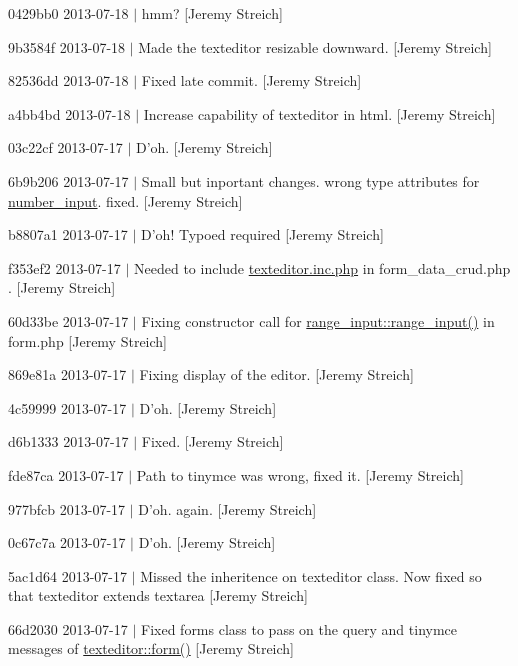 \begin{DoxyItemize}
\item 0429bb0 2013-\/07-\/18 $|$ hmm? \mbox{[}Jeremy Streich\mbox{]}
\item 9b3584f 2013-\/07-\/18 $|$ Made the texteditor resizable downward. \mbox{[}Jeremy Streich\mbox{]}
\item 82536dd 2013-\/07-\/18 $|$ Fixed late commit. \mbox{[}Jeremy Streich\mbox{]}
\item a4bb4bd 2013-\/07-\/18 $|$ Increase capability of texteditor in html. \mbox{[}Jeremy Streich\mbox{]}
\item 03c22cf 2013-\/07-\/17 $|$ D'oh. \mbox{[}Jeremy Streich\mbox{]}
\item 6b9b206 2013-\/07-\/17 $|$ Small but inportant changes. wrong type attributes for \hyperlink{classnumber__input}{number\-\_\-input}. fixed. \mbox{[}Jeremy Streich\mbox{]}
\item b8807a1 2013-\/07-\/17 $|$ D'oh! Typoed required \mbox{[}Jeremy Streich\mbox{]}
\item f353ef2 2013-\/07-\/17 $|$ Needed to include \hyperlink{texteditor_8inc_8php}{texteditor.\-inc.\-php} in form\-\_\-data\-\_\-crud.\-php . \mbox{[}Jeremy Streich\mbox{]}
\item 60d33be 2013-\/07-\/17 $|$ Fixing constructor call for \hyperlink{classrange__input_a6038a3b2b1499abb08ff6a10ac7a8e81}{range\-\_\-input\-::range\-\_\-input()} in form.\-php \mbox{[}Jeremy Streich\mbox{]}
\item 869e81a 2013-\/07-\/17 $|$ Fixing display of the editor. \mbox{[}Jeremy Streich\mbox{]}
\item 4c59999 2013-\/07-\/17 $|$ D'oh. \mbox{[}Jeremy Streich\mbox{]}
\item d6b1333 2013-\/07-\/17 $|$ Fixed. \mbox{[}Jeremy Streich\mbox{]}
\item fde87ca 2013-\/07-\/17 $|$ Path to tinymce was wrong, fixed it. \mbox{[}Jeremy Streich\mbox{]}
\item 977bfcb 2013-\/07-\/17 $|$ D'oh. again. \mbox{[}Jeremy Streich\mbox{]}
\item 0c67c7a 2013-\/07-\/17 $|$ D'oh. \mbox{[}Jeremy Streich\mbox{]}
\item 5ac1d64 2013-\/07-\/17 $|$ Missed the inheritence on texteditor class. Now fixed so that texteditor extends textarea \mbox{[}Jeremy Streich\mbox{]}
\item 66d2030 2013-\/07-\/17 $|$ Fixed forms class to pass on the query and tinymce messages of \hyperlink{classtexteditor_a129b929db008ec11f4a683f542787c74}{texteditor\-::form()} \mbox{[}Jeremy Streich\mbox{]}

\end{DoxyItemize}
